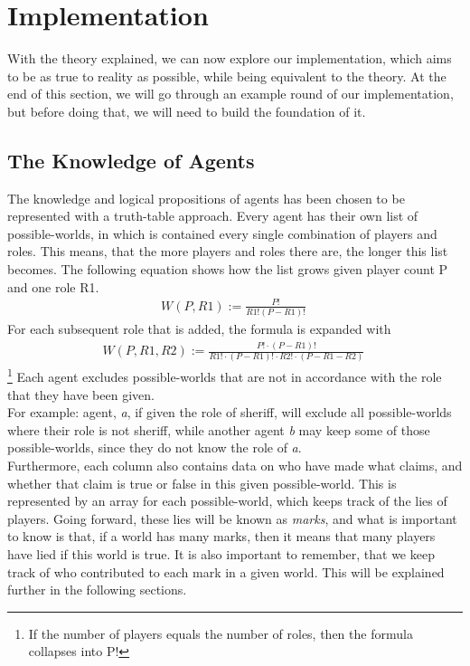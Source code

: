 \section{Implementation}\label{sec:implementation}
With the theory explained, we can now explore our implementation, which aims to 
be as true to reality as possible, while being equivalent to the theory. At the 
end of this section, we will go through an example round of our implementation, 
but before doing that, we will need to build the foundation of it.
\subsection{The Knowledge of Agents}\label{TheKnowledgeOfAgents}
The knowledge and logical propositions of agents has been chosen to be 
represented with a truth-table approach. Every agent has their own 
list of possible-worlds, in which is contained every single combination of 
players and roles. This means, that the more players and roles there are, the 
longer this list becomes. The following equation shows how the list grows given player count P and one role R1. 
\begin{gather}
	W(P,R1) := \frac{P!}{R1!(P-R1)!}\
\end{gather}
For each subsequent role that is added, the formula is expanded with
\begin{gather}
 	W(P, R1, R2) := \frac{P!\cdot(P-R1)!}{R1!\cdot(P-R1)!\cdot R2!\cdot(P-R1-R2)}\
\end{gather}\footnote{If the number of players equals the number of roles, then the formula collapses into P!}
Each agent excludes possible-worlds that are not in 
accordance with the role that they have been given.\\ 
For example: agent, \textit{a}, if given the role of sheriff, will exclude all 
possible-worlds where their role is not sheriff, while another agent \textit{b} may 
keep some of those possible-worlds, since they do not know the role of \textit{a}.\\
Furthermore, each column also contains data on who have made what claims, and 
whether that claim is true or false in this given possible-world. This is represented 
by an array for each possible-world, which keeps track of the lies of players. Going forward, these lies will be known as 
\textit{marks}, and what is important to know is that, if a world has many 
marks, then it means that many players have lied if this world is true. It is 
also important to remember, that we keep track of who contributed to each mark 
in a given world. This will be explained further in the following sections.
